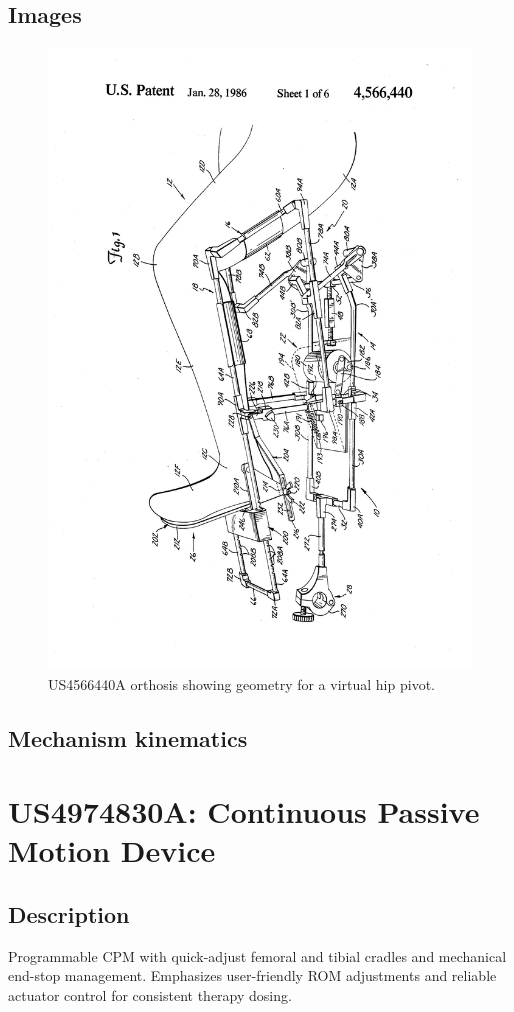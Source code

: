 \documentclass[11pt]{article}
\begin{document}
\subsection{Images}
\begin{figure}[H]
  \centering
  \includegraphics[width=0.54\linewidth, angle=-90]{US4566440_1.png}
  \caption{US4566440A orthosis showing geometry for a virtual hip pivot.}
  \label{fig:US4566440A}
\end{figure}

\subsection{Mechanism kinematics}

\section{US4974830A: Continuous Passive Motion Device}
\subsection{Description}
Programmable CPM with quick-adjust femoral and tibial cradles and mechanical end-stop management. Emphasizes user-friendly ROM adjustments and reliable actuator control for consistent therapy dosing.
\end{document}
